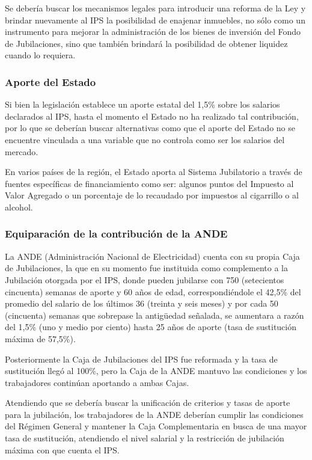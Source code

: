 \documentclass[a4paper,11pt]{article}
\begin{document}
Se debería buscar los mecanismos legales para introducir una reforma de la Ley y brindar nuevamente al IPS la posibilidad de enajenar inmuebles, no sólo como un instrumento para mejorar la administración de los bienes de inversión del Fondo de Jubilaciones, sino que también brindará la posibilidad de obtener liquidez cuando lo requiera.


\subsubsection{Aporte del Estado}

Si bien la legislación establece un aporte estatal del 1,5\% sobre los salarios declarados al IPS, hasta el momento el Estado no ha realizado tal contribución, por lo que se deberían buscar alternativas como que el aporte del Estado no se encuentre vinculada a una variable que no controla como ser los salarios del mercado.

En varios países de la región, el Estado aporta al Sistema Jubilatorio a través de fuentes específicas de financiamiento como ser: algunos puntos del Impuesto al Valor Agregado o un porcentaje de lo recaudado por impuestos al cigarrillo o al alcohol.


\subsubsection{Equiparación de la contribución de la ANDE}

La ANDE (Administración Nacional de Electricidad) cuenta con su propia Caja de Jubilaciones, la que en su momento fue instituida como complemento a la Jubilación otorgada por el IPS, donde pueden jubilarse con 750 (setecientos cincuenta) semanas de aporte y 60 años de edad, correspondiéndole el 42,5\% del promedio del salario de los últimos 36 (treinta y seis meses) y por cada 50 (cincuenta) semanas que sobrepase la antigüedad señalada, se aumentara a razón del 1,5\% (uno y medio por ciento) hasta 25 años de aporte (tasa de sustitución máxima de 57,5\%).

Posteriormente la Caja de Jubilaciones del IPS fue reformada y la tasa de sustitución llegó al 100\%, pero la Caja de la ANDE mantuvo las condiciones y los trabajadores continúan aportando a ambas Cajas.

Atendiendo que se debería buscar la unificación de criterios y tasas de aporte para la jubilación, los trabajadores de la ANDE deberían cumplir las condiciones del Régimen General y mantener la Caja Complementaria en busca de una mayor tasa de sustitución, atendiendo el nivel salarial y la restricción de jubilación máxima con que cuenta el IPS.
\end{document}
